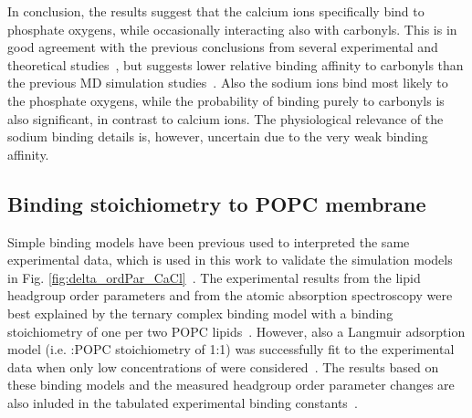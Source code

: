 \documentclass[aip,jcp,twocolumn]{revtex4}
\begin{document}
In conclusion, the results suggest that the calcium ions specifically bind to phosphate
oxygens, while occasionally interacting also with carbonyls. This is in good agreement
with the previous conclusions from several experimental and theoretical
studies~\cite{hauser76,hauser78,herbette84,cevc90,binder02}, but
suggests lower relative binding affinity to carbonyls than the previous MD simulation
studies~\cite{bockmann03,bockmann04,melcrova16,javanainen17}.
Also the sodium ions bind most likely to the phosphate oxygens, while the probability
of binding purely to carbonyls is also significant, in contrast to calcium ions.
The physiological relevance of the sodium binding details is, however, uncertain
due to the very weak binding affinity.

\subsection{Binding stoichiometry to POPC membrane}


Simple binding models have been previous used to interpreted 
the same experimental data, which is used in this work to validate
the simulation models in Fig. \ref{fig:delta_ordPar_CaCl}~\cite{altenbach84,macdonald87}.
The experimental results from the lipid headgroup order parameters and from the
atomic absorption spectroscopy were best
explained by the ternary complex binding model with a binding
stoichiometry of one  per two POPC lipids~\cite{altenbach84}.
However, also a Langmuir adsorption model (i.e. :POPC stoichiometry of 1:1) 
was successfully fit to the experimental data when only low concentrations of  were considered~\cite{macdonald87}.
The results based on these binding models and the measured headgroup order parameter changes
are also inluded in the tabulated experimental binding constants~\cite{marsh13}.
\end{document}
